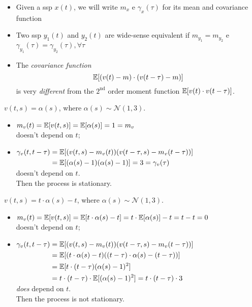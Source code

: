 
\begin{obs}
\begin{itemize}
	\item Given a \gls{ssp} $x(t)$, we will write $m_{x}$ e $\gamma_{x}(\tau)$ for its mean and covariance function
	\item Two \gls{ssp} $y_{1}(t)$ and $y_{2}(t)$ are wide-sense equivalent if $m_{y_{1}}=m_{y_{2}}$ e $\gamma_{y_{1}}(\tau)=\gamma_{y_{2}}(\tau), \forall \tau$
	\item The \emph{covariance function}
	$$
		\mathbb{E}[(v(t)-m) \cdot(v(t-\tau)-m)]
	$$
	is very \emph{different} from the $2^{\text{nd}}$ order moment function $\mathbb{E}[v(t) \cdot v(t-\tau)]$.
\end{itemize}
\end{obs}
\begin{example}
$\boxed{v(t,s)=\alpha (s)}$, where $\alpha (s)\sim \mathcal{N}(1,3)$.

\begin{itemize}
	\item $m_{v}(t)=\mathbb{E}[v(t, s)]=\mathbb{E}[\alpha(s)]=1=m_{v}$\\
	doesn't depend on $t$;
	\item $\begin{aligned}[t]
		\gamma_{v}(t, t-\tau)&=\mathbb{E}[(v(t, s)-m_{v}(t))(v(t-\tau, s)-m_{v}(t-\tau))]\\
		&=\mathbb{E}[(\alpha(s)-1)(\alpha(s)-1)]=3=\gamma_{v}(\tau)
	\end{aligned}$\\
	doesn't depend on $t$.\\
	Then the process is stationary.
\end{itemize}
\end{example}

\begin{example}
$\boxed{v(t, s)=t \cdot \alpha(s)-t}$, where $\alpha(s) \sim \mathcal{N}(1,3)$.
\begin{itemize}
	\item $m_{v}(t)=\mathbb{E}[v(t, s)]=\mathbb{E}[t \cdot \alpha(s)-t]=t \cdot \mathbb{E}[\alpha(s)]-t=t-t=0$\\
	doesn't depend on $t$;
	\item $\begin{aligned}[t]
		\gamma_{v}(t, t-\tau)&=\mathbb{E}[(v(t, s)-m_{v}(t))(v(t-\tau, s)-m_{v}(t-\tau))]\\
	&=\mathbb{E}[(t \cdot \alpha(s)-t)((t-\tau) \cdot \alpha(s)-(t-\tau))]\\
	&=\mathbb{E}[t \cdot(t-\tau)(\alpha(s)-1)^{2}]\\
	&=t \cdot(t-\tau) \cdot \mathbb{E}[(\alpha(s)-1)^{2}]=t \cdot(t-\tau) \cdot 3
	\end{aligned}$\\
	\emph{does} depend on $t$.\\
	Then the process is not stationary.
\end{itemize}
\end{example}

